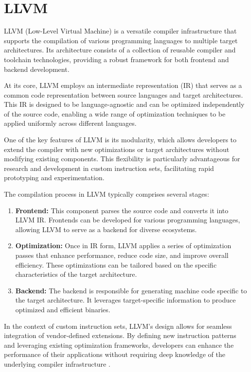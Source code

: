 \section{LLVM}

LLVM (Low-Level Virtual Machine) is a versatile compiler infrastructure that supports the compilation of various programming languages to multiple target architectures. Its architecture consists of a collection of reusable compiler and toolchain technologies, providing a robust framework for both frontend and backend development.

At its core, LLVM employs an intermediate representation (IR) that serves as a common code representation between source languages and target architectures. This IR is designed to be language-agnostic and can be optimized independently of the source code, enabling a wide range of optimization techniques to be applied uniformly across different languages.

One of the key features of LLVM is its modularity, which allows developers to extend the compiler with new optimizations or target architectures without modifying existing components. This flexibility is particularly advantageous for research and development in custom instruction sets, facilitating rapid prototyping and experimentation.

The compilation process in LLVM typically comprises several stages:

\begin{enumerate}
    \item \textbf{Frontend:} This component parses the source code and converts it into LLVM IR. Frontends can be developed for various programming languages, allowing LLVM to serve as a backend for diverse ecosystems.

    \item \textbf{Optimization:} Once in IR form, LLVM applies a series of optimization passes that enhance performance, reduce code size, and improve overall efficiency. These optimizations can be tailored based on the specific characteristics of the target architecture.

    \item \textbf{Backend:} The backend is responsible for generating machine code specific to the target architecture. It leverages target-specific information to produce optimized and efficient binaries.
\end{enumerate}

In the context of custom instruction sets, LLVM's design allows for seamless integration of vendor-defined extensions. By defining new instruction patterns and leveraging existing optimization frameworks, developers can enhance the performance of their applications without requiring deep knowledge of the underlying compiler infrastructure \cite{llvm}.

